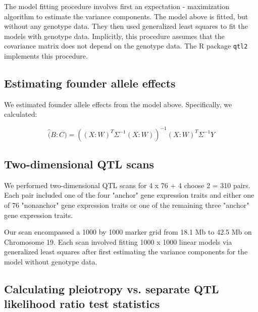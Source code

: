 \documentclass{article}
\begin{document}
The model fitting procedure involves first an expectation - maximization algorithm to estimate the variance components. The model above is fitted, but without any genotype data. They then used generalized least squares to fit the models with genotype data. Implicitly, this procedure assumes that the covariance matrix does not depend on the genotype data. The R package \texttt{qtl2} implements this procedure. 

\subsection{Estimating founder allele effects}

We estimated founder allele effects from the model above. Specifically, we calculated:

\begin{equation}
\hat (B:C) = \left((X:W)^T\Sigma^{-1}(X:W)\right)^{-1}(X:W)^T\Sigma^{-1}Y
\end{equation}

\subsection{Two-dimensional QTL scans}

We performed two-dimensional QTL scans for 4 x 76 + 4 choose 2 = 310 pairs. Each pair included one of the four "anchor" gene expression traits and either one of 76 "nonanchor" gene expression traits or one of the remaining three "anchor" gene expression traits. 

Our scan encompassed a 1000 by 1000 marker grid from 18.1 Mb to 42.5 Mb on Chromosome 19. Each scan involved fitting 1000 x 1000 linear models via generalized least squares after first estimating the variance components for the model without genotype data. 








\subsection{Calculating pleiotropy vs. separate QTL likelihood ratio test statistics}




\end{document}
